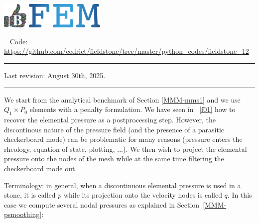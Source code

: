 \includegraphics[height=1.25cm]{images/pictograms/benchmark}
\includegraphics[height=1.25cm]{images/pictograms/FEM}


%

\begin{center}
\inpython ~
{\small Code: \url{https://github.com/cedrict/fieldstone/tree/master/python_codes/fieldstone_12}}
\end{center}

\par\noindent\rule{\textwidth}{0.4pt}

Last revision: August 30th, 2025.

\par\noindent\rule{\textwidth}{0.4pt}


We start from the analytical benchmark of Section \ref{MMM-mms1} and we use $Q_1 \times P_0$
elements with a penalty formulation. 
We have seen in \stone~\ref{f01} how to recover the elemental pressure as a postprocessing step. 
However, the discontinous nature of the pressure field (and the presence of a
parasitic checkerboard mode) can be problematic for many reasons 
(pressure enters the rheology, equation of state, plotting, ...). 
We then wish to project the elemental pressure onto the nodes of the mesh while at the same 
time filtering the checkerboard mode out. 

Terminology: in general, when a discontinuous elemental pressure is used in a stone, 
it is called $p$ while its projection onto the velocity nodes is called $q$. 
In this case we compute several nodal pressures as explained in Section~\ref{MMM-psmoothing}:

